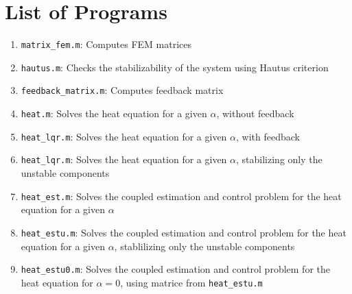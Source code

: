 \documentclass[12pt]{article}
\begin{document}

\section{List of Programs}

\begin{enumerate}

\item {\tt matrix\_fem.m}: Computes FEM matrices

\item {\tt hautus.m}: Checks the stabilizability of the system using Hautus criterion

\item {\tt feedback\_matrix.m}: Computes feedback matrix

\item {\tt heat.m}: Solves the heat equation for a given $\alpha$, without feedback

\item {\tt heat\_lqr.m}: Solves the heat equation for a given $\alpha$, with feedback

\item {\tt heat\_lqr.m}: Solves the heat equation for a given $\alpha$, stabilizing only the unstable components

\item {\tt heat\_est.m}: Solves the coupled estimation and control problem for the heat equation for a given $\alpha$

\item {\tt heat\_estu.m}: Solves the coupled estimation and control problem for the heat equation for a given $\alpha$, stablilizing only the unstable components

\item {\tt heat\_estu0.m}: Solves the coupled estimation and control problem for the heat equation for $\alpha = 0$, using matrice from {\tt heat\_estu.m}

\end{enumerate}
\end{document}

